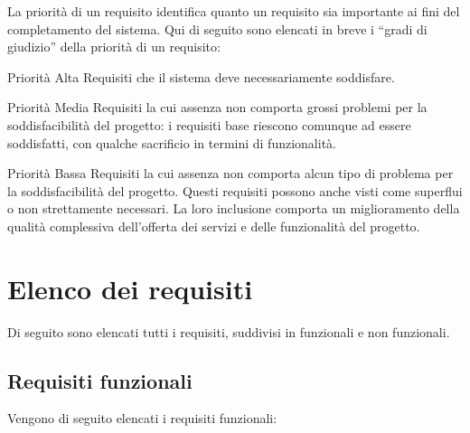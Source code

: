 La priorità di un requisito identifica quanto un requisito sia importante ai fini del completamento del sistema.
Qui di seguito sono elencati in breve i ``gradi di giudizio'' della priorità di un requisito:

\begin{descriptionInd}
	\item[Priorità Alta] Requisiti che il sistema deve necessariamente soddisfare.
	\item[Priorità Media] Requisiti la cui assenza non comporta grossi problemi per la soddisfacibilità del progetto: i requisiti base riescono comunque ad essere soddisfatti, con qualche sacrificio in termini di funzionalità. 
	\item[Priorità Bassa] Requisiti la cui assenza non comporta alcun tipo di problema per la soddisfacibilità del progetto. Questi requisiti possono anche visti come superflui o non strettamente necessari. La loro inclusione comporta un miglioramento della qualità complessiva dell’offerta dei servizi e delle funzionalità del progetto.
\end{descriptionInd}

\section{Elenco dei requisiti}
\label{sec:elenco_dei_requisiti}
Di seguito sono elencati tutti i requisiti, suddivisi in funzionali e non funzionali.

\subsection{Requisiti funzionali}
Vengono di seguito elencati i requisiti funzionali:

